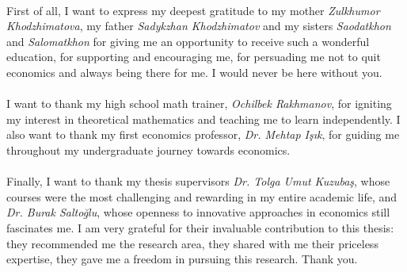 \documentclass[
11pt, %
english, %
singlespacing, %
headsepline, %
]{MastersDoctoralThesis} %
\begin{document}
\begin{acknowledgements}
  \addchaptertocentry{\acknowledgementname} %
  \paragraph*{}First of all, I want to express my deepest gratitude to my mother \textit{Zulkhumor Khodzhimatova}, my father \textit{Sadykzhan Khodzhimatov} and my sisters \textit{Saodatkhon} and \textit{Salomatkhon} for giving me an opportunity to receive such a wonderful education, for supporting and encouraging me, for persuading me not to quit economics and always being there for me. I would never be here without you.
  \paragraph*{}I want to thank my high school math trainer, \textit{Ochilbek Rakhmanov}, for igniting my interest in theoretical mathematics and teaching me to learn independently. I also want to thank my first economics professor, \textit{Dr. Mehtap Işık}, for guiding me throughout my undergraduate journey towards economics.
  \paragraph*{}Finally, I want to thank my thesis supervisors \textit{Dr. Tolga Umut Kuzubaş}, whose courses were the most challenging and rewarding in my entire academic life, and \textit{Dr. Burak Saltoğlu}, whose openness to innovative approaches in economics still fascinates me. I am very grateful for their invaluable contribution to this thesis: they recommended me the research area, they shared with me their priceless expertise, they gave me a freedom in pursuing this research. Thank you.   
\end{acknowledgements}


\tableofcontents %

\listoffigures %

\listoftables %


\end{document}

